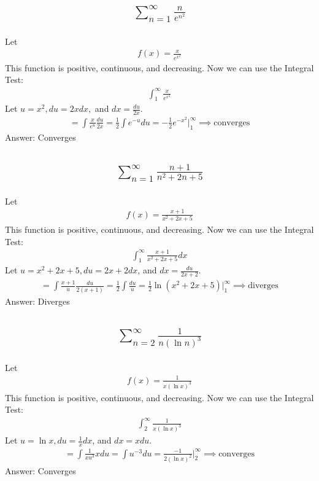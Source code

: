 \documentclass{article}
\begin{document}
\subsection{
	\begin{align*}
		\sum_{n = 1}^\infty \frac{n}{e^{n^2}}
	\end{align*}
}
Let
\begin{align*}
	f(x) = \frac{x}{e^{x^2}}
\end{align*}
This function is positive, continuous, and decreasing. Now we can use the Integral Test:
\begin{align*}
	\int_1^\infty {\frac{x}{e^{x^2}}}
\end{align*}
Let $u = x^2, du = 2xdx,$ and $dx = \frac{du}{2x}$. 
\begin{align*}
	= \int{\frac{x}{e^u}\frac{du}{2x}} = \frac{1}{2} \int{e^{-u} du} = -\frac{1}{2} e^{-x^2} \bigg|_1^\infty \implies \text{converges}
\end{align*}
Answer: Converges

\subsection{
	\begin{align*}
		\sum_{n = 1}^\infty \frac{n + 1}{n^2 + 2n + 5}
	\end{align*}
}
Let
\begin{align*}
	f(x) = \frac{x + 1}{x^2 + 2x + 5}
\end{align*}
This function is positive, continuous, and decreasing. Now we can use the Integral Test:
\begin{align*}
	\int_1^\infty {\frac{x + 1}{x^2 + 2x + 5} dx}
\end{align*}
Let $u = x^2 + 2x + 5, du = 2x + 2 dx$, and $dx = \frac{du}{2x + 2}$. 
\begin{align*}
	= \int{\frac{x + 1}{u} \frac{du}{2(x + 1)}} = \frac{1}{2} \int{\frac{du}{u}} = \frac{1}{2} \ln{(x^2 + 2x + 5)} \bigg|_1^\infty \implies \text{diverges}
\end{align*}
Answer: Diverges

\subsection{
	\begin{align*}
		\sum_{n = 2}^\infty \frac{1}{n(\ln{n})^3}
	\end{align*}
}
Let 
\begin{align*}
	f(x) = \frac{1}{x(\ln{x})^3}
\end{align*}
This function is positive, continuous, and decreasing. Now we can use the Integral Test:
\begin{align*}
	\int_2^\infty {\frac{1}{x(\ln{x})^3}}
\end{align*}
Let $u = \ln{x}, du = \frac{1}{x} dx$, and $dx = x du$. 
\begin{align*}
	= \int{\frac{1}{x u^3}x du} = \int{u^{-3}du} = \frac{-1}{2(\ln{x})^2} \bigg|_2^\infty \implies \text{converges}
\end{align*}
Answer: Converges
\end{document}
